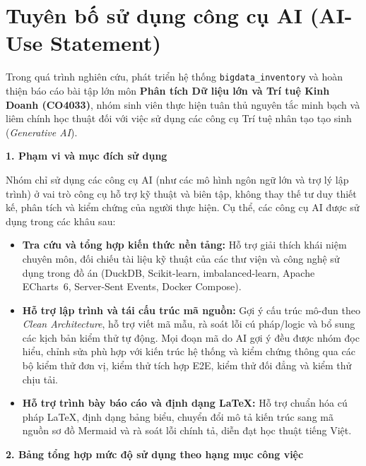 \clearpage
\part*{Tuyên bố sử dụng công cụ AI (AI-Use Statement)}

Trong quá trình nghiên cứu, phát triển hệ thống \texttt{bigdata_inventory} và hoàn thiện báo cáo bài tập lớn môn \textbf{Phân tích Dữ liệu lớn và Trí tuệ Kinh Doanh (CO4033)}, nhóm sinh viên thực hiện tuân thủ nguyên tắc minh bạch và liêm chính học thuật đối với việc sử dụng các công cụ Trí tuệ nhân tạo tạo sinh (\textit{Generative AI}).

\medskip
\noindent\textbf{1. Phạm vi và mục đích sử dụng}

Nhóm chỉ sử dụng các công cụ AI (như các mô hình ngôn ngữ lớn và trợ lý lập trình) ở vai trò công cụ hỗ trợ kỹ thuật và biên tập, không thay thế tư duy thiết kế, phân tích và kiểm chứng của người thực hiện. Cụ thể, các công cụ AI được sử dụng trong các khâu sau:
\begin{itemize}[topsep=4pt, itemsep=3pt]
	\item \textbf{Tra cứu và tổng hợp kiến thức nền tảng:} Hỗ trợ giải thích khái niệm chuyên môn, đối chiếu tài liệu kỹ thuật của các thư viện và công nghệ sử dụng trong đồ án (DuckDB, Scikit-learn, imbalanced-learn, Apache ECharts~6, Server-Sent Events, Docker Compose).
	\item \textbf{Hỗ trợ lập trình và tái cấu trúc mã nguồn:} Gợi ý cấu trúc mô-đun theo \textit{Clean Architecture}, hỗ trợ viết mã mẫu, rà soát lỗi cú pháp/logic và bổ sung các kịch bản kiểm thử tự động. Mọi đoạn mã do AI gợi ý đều được nhóm đọc hiểu, chỉnh sửa phù hợp với kiến trúc hệ thống và kiểm chứng thông qua các bộ kiểm thử đơn vị, kiểm thử tích hợp E2E, kiểm thử đối đẳng và kiểm thử chịu tải.
	\item \textbf{Hỗ trợ trình bày báo cáo và định dạng \LaTeX{}:} Hỗ trợ chuẩn hóa cú pháp \LaTeX{}, định dạng bảng biểu, chuyển đổi mô tả kiến trúc sang mã nguồn sơ đồ Mermaid và rà soát lỗi chính tả, diễn đạt học thuật tiếng Việt.
\end{itemize}

\medskip
\noindent\textbf{2. Bảng tổng hợp mức độ sử dụng theo hạng mục công việc}

